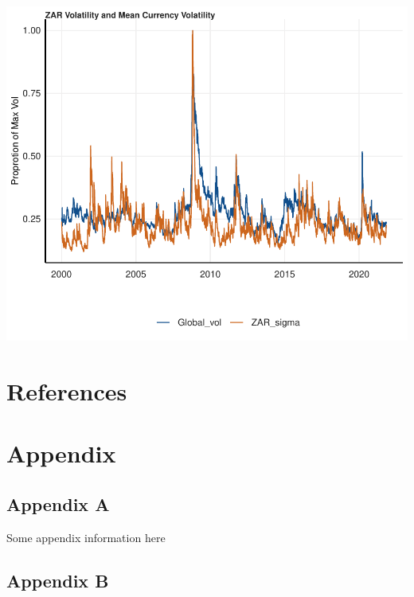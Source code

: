 \documentclass[11pt,preprint, authoryear]{elsarticle}
\numberwithin{equation}{section}
\numberwithin{figure}{section}
\numberwithin{table}{section}
\newlength{\cslhangindent}
\newenvironment{CSLReferences}%
  {\setlength{\parindent}{0pt}%
  \everypar{\setlength{\hangindent}{\cslhangindent}}\ignorespaces}%
  {\par}
\begin{document}
\includegraphics{Question5_files/figure-latex/unnamed-chunk-17-1.pdf}

\newpage

\hypertarget{references}{%
\section*{References}\label{references}}

\hypertarget{refs}{}
\begin{CSLReferences}{0}{0}
\end{CSLReferences}

\hypertarget{appendix}{%
\section*{Appendix}\label{appendix}}

\hypertarget{appendix-a}{%
\subsection*{Appendix A}\label{appendix-a}}

Some appendix information here

\hypertarget{appendix-b}{%
\subsection*{Appendix B}\label{appendix-b}}


\end{document}
